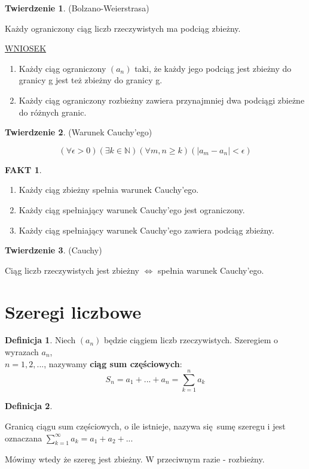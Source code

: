 \documentclass{article}
\theoremstyle{definition}
\newtheorem{de}{Definicja}[subsection]
\theoremstyle{definition}
\newtheorem{tw}{Twierdzenie}[subsection]
\theoremstyle{definition}
\newtheorem*{fakt}{FAKT}
\begin{document}
\begin{tw}
(Bolzano-Weierstrasa)

Każdy ograniczony ciąg liczb rzeczywistych ma podciąg zbieżny.

\underline{WNIOSEK}
\begin{enumerate}
\item Każdy ciąg ograniczony $ (a_n) $ taki, że każdy jego podciąg jest
      zbieżny do granicy g jest też zbieżny do granicy g.
\item Każdy ciąg ograniczony rozbieżny zawiera przynajmniej 
      dwa podciągi zbieżne do różnych granic.
\end{enumerate}
\end{tw}

\begin{tw}
(Warunek Cauchy'ego)

$$ (\forall \epsilon > 0)(\exists k \in \mathbb{N})(\forall m,n \geq k)
   (|a_m - a_n| < \epsilon)
$$
\end{tw}

\begin{fakt}
\

\begin{enumerate}
\item Każdy ciąg zbieżny spełnia warunek Cauchy'ego.
\item Każdy ciąg spełniający warunek Cauchy'ego jest ograniczony.
\item Każdy ciąg spełniający warunek Cauchy'ego zawiera podciąg zbieżny.
\end{enumerate}
\end{fakt}

\begin{tw}
(Cauchy)

Ciąg liczb rzeczywistych jest zbieżny $\iff$ spełnia warunek Cauchy'ego.
\end{tw}

\section{Szeregi liczbowe}

\begin{de}
Niech $(a_n)$ będzie ciągiem liczb rzeczywistych. Szeregiem o wyrazach 
$a_n$,\\ $n=1,2,...$, nazywamy \textbf{ciąg sum częściowych}:
$$
  S_n = a_1 +...+ a_n = \sum_{k=1}^{n} a_k
$$
\end{de}

\begin{de}
\

Granicą ciągu sum częściowych, o ile istnieje, nazywa się sumę szeregu
i jest oznaczana $ \sum_{k=1}^{\infty} a_k = a_1 + a_2 + ... $

Mówimy wtedy że szereg jest zbieżny. W przeciwnym razie - rozbieżny.
\end{de}
\end{document}
